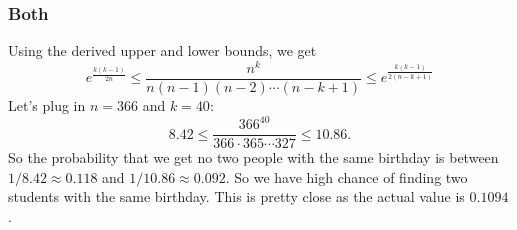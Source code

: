 \begin{frame}\frametitle{Both}
  Using the derived upper and lower bounds, we get
  \[
  e^{\frac{k(k-1)}{2n}}\leq
  \frac{n^k}{n(n-1)(n-2)\cdots(n-k+1)}
  \leq e^{\frac{k(k-1)}{2(n-k+1)}}
  \]
  \pause
  Let's plug in $n=366$ and $k=40$:
  \[
  8.42\leq \frac{366^{40}}{366\cdot 365\cdots 327}\leq 10.86.
  \]
  \pause
  So the probability that we get no two people with the same birthday
  is between $1/8.42 \approx 0.118$ and $1/10.86 \approx 0.092$.  So
  we have high chance of finding two students with the same
  birthday. \pause This is pretty close as the actual value is
  $0.1094$.
\end{frame}
